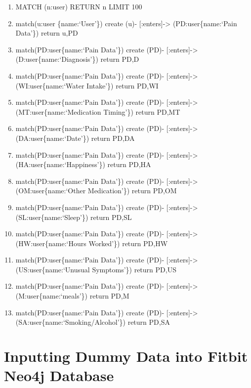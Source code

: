 \documentclass[]{book}
\providecommand{\tightlist}{%
  \setlength{\itemsep}{0pt}\setlength{\parskip}{0pt}}
\begin{document}
\begin{enumerate}
\def\labelenumi{\arabic{enumi}.}
\setcounter{enumi}{36}
\tightlist
\item
  MATCH (n:user) RETURN n LIMIT 100
\item
  match(u:user \{name:`User'\}) create (u)- {[}:enters{]}-\textgreater{}
  (PD:user\{name:`Pain Data'\}) return u,PD
\item
  match(PD:user\{name:`Pain Data'\}) create (PD)-
  {[}:enters{]}-\textgreater{} (D:user\{name:`Diagnosis'\}) return PD,D
\item
  match(PD:user\{name:`Pain Data'\}) create (PD)-
  {[}:enters{]}-\textgreater{} (WI:user\{name:`Water Intake'\}) return
  PD,WI
\item
  match(PD:user\{name:`Pain Data'\}) create (PD)-
  {[}:enters{]}-\textgreater{} (MT:user\{name:`Medication Timing'\})
  return PD,MT
\item
  match(PD:user\{name:`Pain Data'\}) create (PD)-
  {[}:enters{]}-\textgreater{} (DA:user\{name:`Date'\}) return PD,DA
\item
  match(PD:user\{name:`Pain Data'\}) create (PD)-
  {[}:enters{]}-\textgreater{} (HA:user\{name:`Happiness'\}) return
  PD,HA
\item
  match(PD:user\{name:`Pain Data'\}) create (PD)-
  {[}:enters{]}-\textgreater{} (OM:user\{name:`Other Medication'\})
  return PD,OM
\item
  match(PD:user\{name:`Pain Data'\}) create (PD)-
  {[}:enters{]}-\textgreater{} (SL:user\{name:`Sleep'\}) return PD,SL
\item
  match(PD:user\{name:`Pain Data'\}) create (PD)-
  {[}:enters{]}-\textgreater{} (HW:user\{name:`Hours Worked'\}) return
  PD,HW
\item
  match(PD:user\{name:`Pain Data'\}) create (PD)-
  {[}:enters{]}-\textgreater{} (US:user\{name:`Unusual Symptoms'\})
  return PD,US
\item
  match(PD:user\{name:`Pain Data'\}) create (PD)-
  {[}:enters{]}-\textgreater{} (M:user\{name:`meals'\}) return PD,M
\item
  match(PD:user\{name:`Pain Data'\}) create (PD)-
  {[}:enters{]}-\textgreater{} (SA:user\{name:`Smoking/Alcohol'\})
  return PD,SA
\end{enumerate}

\section{Inputting Dummy Data into Fitbit Neo4j
Database}\label{inputting-dummy-data-into-fitbit-neo4j-database}
\end{document}
